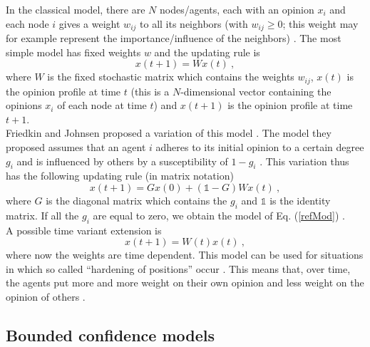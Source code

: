 \documentclass[11 pt , letterpaper , twoside , openright]{book}
\begin{document}
In the classical model, there are $N$ nodes/agents, each with an opinion $x_i$ and each node $i$ gives a weight $w_{ij}$ to all its neighbors (with $w_{ij} \geqslant 0$; this weight may for example represent the importance/influence of the neighbors) \cite{Krause2002}. The most simple model has fixed weights $w$ and the updating rule is \cite{Krause2002}
\begin{equation}\label{refMod}
	x(t+1) = W x(t) \ ,
\end{equation}
where $W$ is the fixed stochastic matrix which contains the weights $w_{ij}$, $x(t)$ is the opinion profile at time $t$ (this is a $N$-dimensional vector containing the opinions $x_i$ of each node at time $t$) and $x(t+1)$ is the opinion profile at time $t+1$.\\
\newline
Friedkin and Johnsen proposed a variation of this model \cite{Friedkin1990}\cite{Friedkin1999}. The model they proposed assumes that an agent $i$ adheres to its initial opinion to a certain degree $g_i$ and is influenced by others by a susceptibility of $1-g_i$ \cite{Krause2002}. This variation thus has the following updating rule (in matrix notation) \cite{Krause2002}
\begin{equation}
	x(t+1) = Gx(0) + (\mathbb{1}-G)Wx(t) \ ,
\end{equation}
where $G$ is the diagonal matrix which contains the $g_i$ and $\mathbb{1}$ is the identity matrix. If all the $g_i$ are equal to zero, we obtain the model of Eq. (\ref{refMod}) \cite{Krause2002}.\\
\newline
A possible time variant extension is \cite{Krause2002}
\begin{equation}
	x(t+1) = W(t)x(t) \ ,
\end{equation}
where now the weights are time dependent. This model can be used for situations in which so called ``hardening of positions'' occur \cite{Krause2002}. This means that, over time, the agents put more and more weight on their own opinion and less weight on the opinion of others \cite{Krause2002}. 

\subsection{Bounded confidence models}\label{bounded}
\end{document}
